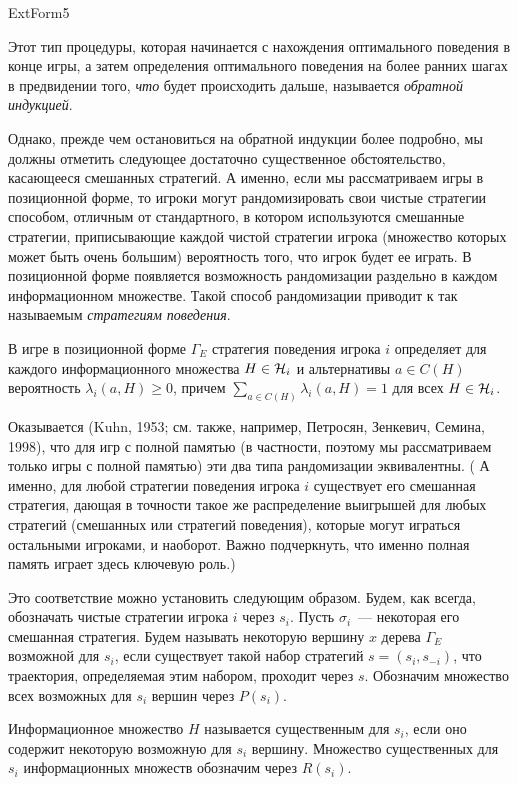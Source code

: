 \documentclass[12pt]{article}
\begin{document}
ExtForm5



Этот тип процедуры, которая начинается с нахождения оптимального
поведения в конце игры, а затем определения оптимального поведения
на более ранних шагах в предвидении того, \emph{что} будет происходить
дальше, называется \emph{обратной индукцией}.

Однако, прежде чем остановиться на обратной индукции более подробно,
мы должны отметить следующее достаточно существенное обстоятельство,
касающееся смешанных стратегий. А именно, если мы рассматриваем игры
в позиционной форме, то игроки могут рандомизировать свои чистые
стратегии способом, отличным от стандартного, в котором используются
смешанные стратегии, приписывающие каждой чистой стратегии игрока
(множество которых может быть очень большим) вероятность того, что
игрок будет ее играть. В позиционной форме появляется возможность
рандомизации раздельно в каждом информационном множестве. Такой
способ рандомизации приводит к так называемым {\it стратегиям
поведения}.

\begin{definition}
В игре в позиционной форме $\Gamma_E$ стратегия поведения игрока $i$
определяет для каждого информационного множества $H\in {\cal H}_i$ и
альтернативы $a\in C(H)$ вероятность $\lambda_i(a,H)\geq 0$, причем
$\sum_{a\in C(H)}\lambda_i(a,H)=1$ для всех $H\in {\cal H}_i$.
\end{definition}

Оказывается (Kuhn, 1953; см. также, например, Петросян, Зенкевич,
Семина, 1998), что для игр с полной памятью (в частности, поэтому мы
рассматриваем только игры с полной памятью) эти два типа
рандомизации эквивалентны. ( А именно, для любой стратегии поведения
игрока $i$ существует его смешанная стратегия, дающая в точности
такое же распределение выигрышей для любых стратегий (смешанных или
стратегий поведения), которые могут играться остальными игроками, и
наоборот. Важно подчеркнуть, что именно полная память
играет здесь ключевую роль.)

Это соответствие можно установить следующим образом. Будем, как
всегда, обозначать чистые стратегии игрока $i$ через $s_i$. Пусть
$\sigma_i$~--- некоторая его смешанная стратегия. Будем называть
некоторую вершину $x$ дерева $\Gamma_E$ возможной для $s_i$, если
существует такой набор стратегий $s=(s_i,s_{-i})$, что траектория,
определяемая этим набором, проходит через $s$. Обозначим множество
всех возможных для $s_i$ вершин через $P(s_i)$.

Информационное множество $H$ называется существенным для $s_i$, если
оно содержит некоторую возможную для $s_i$ вершину. Множество
существенных для $s_i$ информационных множеств обозначим через
$R(s_i)$.
\end{document}
